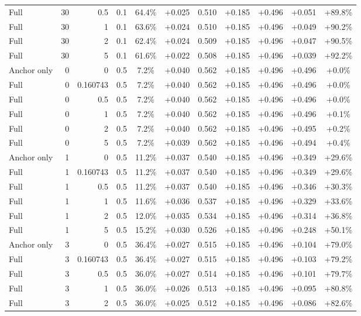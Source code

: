 \begin{table}[htbp]
\begin{tabular}{lrrrccccccc}
Full & 30 & 0.5 & 0.1 & 64.4\% & +0.025 & 0.510 & +0.185 & +0.496 & +0.051 & +89.8\% \\
Full & 30 & 1 & 0.1 & 63.6\% & +0.024 & 0.510 & +0.185 & +0.496 & +0.049 & +90.2\% \\
Full & 30 & 2 & 0.1 & 62.4\% & +0.024 & 0.509 & +0.185 & +0.496 & +0.047 & +90.5\% \\
Full & 30 & 5 & 0.1 & 61.6\% & +0.022 & 0.508 & +0.185 & +0.496 & +0.039 & +92.2\% \\
Anchor only & 0 & 0 & 0.5 & 7.2\% & +0.040 & 0.562 & +0.185 & +0.496 & +0.496 & +0.0\% \\
Full & 0 & 0.160743 & 0.5 & 7.2\% & +0.040 & 0.562 & +0.185 & +0.496 & +0.496 & +0.0\% \\
Full & 0 & 0.5 & 0.5 & 7.2\% & +0.040 & 0.562 & +0.185 & +0.496 & +0.496 & +0.0\% \\
Full & 0 & 1 & 0.5 & 7.2\% & +0.040 & 0.562 & +0.185 & +0.496 & +0.496 & +0.1\% \\
Full & 0 & 2 & 0.5 & 7.2\% & +0.040 & 0.562 & +0.185 & +0.496 & +0.495 & +0.2\% \\
Full & 0 & 5 & 0.5 & 7.2\% & +0.039 & 0.562 & +0.185 & +0.496 & +0.494 & +0.4\% \\
Anchor only & 1 & 0 & 0.5 & 11.2\% & +0.037 & 0.540 & +0.185 & +0.496 & +0.349 & +29.6\% \\
Full & 1 & 0.160743 & 0.5 & 11.2\% & +0.037 & 0.540 & +0.185 & +0.496 & +0.349 & +29.6\% \\
Full & 1 & 0.5 & 0.5 & 11.2\% & +0.037 & 0.540 & +0.185 & +0.496 & +0.346 & +30.3\% \\
Full & 1 & 1 & 0.5 & 11.6\% & +0.036 & 0.537 & +0.185 & +0.496 & +0.329 & +33.6\% \\
Full & 1 & 2 & 0.5 & 12.0\% & +0.035 & 0.534 & +0.185 & +0.496 & +0.314 & +36.8\% \\
Full & 1 & 5 & 0.5 & 15.2\% & +0.030 & 0.526 & +0.185 & +0.496 & +0.248 & +50.1\% \\
Anchor only & 3 & 0 & 0.5 & 36.4\% & +0.027 & 0.515 & +0.185 & +0.496 & +0.104 & +79.0\% \\
Full & 3 & 0.160743 & 0.5 & 36.4\% & +0.027 & 0.515 & +0.185 & +0.496 & +0.103 & +79.2\% \\
Full & 3 & 0.5 & 0.5 & 36.0\% & +0.027 & 0.514 & +0.185 & +0.496 & +0.101 & +79.7\% \\
Full & 3 & 1 & 0.5 & 36.0\% & +0.026 & 0.513 & +0.185 & +0.496 & +0.095 & +80.8\% \\
Full & 3 & 2 & 0.5 & 36.0\% & +0.025 & 0.512 & +0.185 & +0.496 & +0.086 & +82.6\% \\

\end{tabular}
\end{table}
